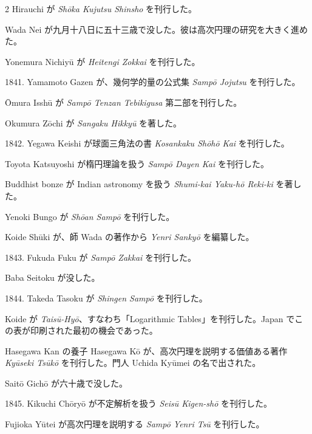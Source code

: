 \documentclass[11pt]{article}
\newcommand{\scanfooter}{}
\begin{document}
\begin{multicols}{2}
Hirauchi が \emph{Shōka Kujutsu Shinsho} を刊行した。

Wada Nei が九月十八日に五十三歳で没した。彼は高次円理の研究を大きく進めた。

Yonemura Nichiyū が \emph{Heitengi Zokkai} を刊行した。

1841. Yamamoto Gazen が、幾何学的量の公式集 \emph{Sampō Jojutsu} を刊行した。

Ōmura Isshū が \emph{Sampō Tenzan Tebikigusa} 第二部を刊行した。

Okumura Zōchi が \emph{Sangaku Hikkyū} を著した。

1842. Yegawa Keishi が球面三角法の書 \emph{Kosankaku Shōhō Kai} を刊行した。

Toyota Katsuyoshi が楕円理論を扱う \emph{Sampō Dayen Kai} を刊行した。

Buddhist bonze が Indian astronomy を扱う \emph{Shumi-kai Yaku-hō Reki-ki} を著した。

Yenoki Bungo が \emph{Shōan Sampō} を刊行した。

Koide Shūki が、師 Wada の著作から \emph{Yenri Sankyō} を編纂した。

1843. Fukuda Fuku が \emph{Sampō Zakkai} を刊行した。

Baba Seitoku が没した。

1844. Takeda Tasoku が \emph{Shingen Sampō} を刊行した。

Koide が \emph{Taisū-Hyō}、すなわち「Logarithmic Tables」を刊行した。Japan でこの表が印刷された最初の機会であった。

Hasegawa Kan の養子 Hasegawa Kō が、高次円理を説明する価値ある著作 \emph{Kyūseki Tsūkō} を刊行した。門人 Uchida Kyūmei の名で出された。

Saitō Gichō が六十歳で没した。

1845. Kikuchi Chōryō が不定解析を扱う \emph{Seisū Kigen-shō} を刊行した。

Fujioka Yūtei が高次円理を説明する \emph{Sampō Yenri Tsū} を刊行した。
\end{multicols}
\scanfooter
\end{document}
